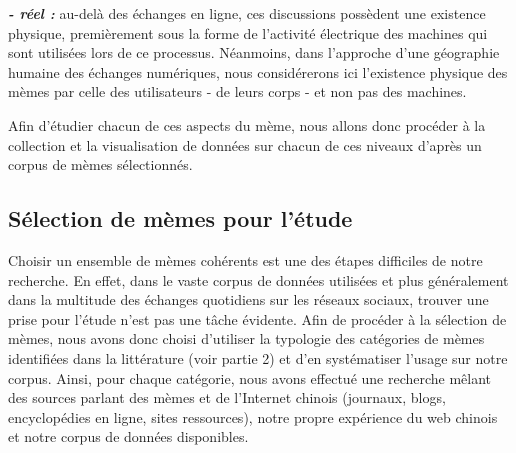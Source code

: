 \textbf{\textit{{}- réel : }}au-delà des échanges en ligne, ces
discussions possèdent une existence physique, premièrement sous la
forme de l{\textquoteright}activité électrique des machines qui
sont utilisées lors de ce processus. Néanmoins, dans
l{\textquoteright}approche d{\textquoteright}une géographie humaine
des échanges numériques, nous considérerons ici
l{\textquoteright}existence physique des mèmes par celle des
utilisateurs - de leurs corps - et non pas des machines.

Afin d{\textquoteright}étudier chacun de ces aspects du mème, nous
allons donc procéder à la collection et la visualisation de
données sur chacun de ces niveaux d{\textquoteright}après un corpus
de mèmes sélectionnés.

\subsection[Sélection de mèmes pour l{\textquoteright}étude]{\textmd{\textup{ Sélection de
mèmes pour l{\textquoteright}étude}}}
Choisir un ensemble de mèmes cohérents est une des étapes
difficiles de notre recherche. En effet, dans le vaste corpus de
données utilisées et plus généralement dans la multitude des
échanges quotidiens sur les réseaux sociaux, trouver une prise pour
l{\textquoteright}étude n{\textquoteright}est pas une t\^ache
évidente. Afin de procéder à la sélection de mèmes, nous
avons donc choisi d{\textquoteright}utiliser la typologie des
catégories de mèmes identifiées dans la littérature (voir
partie 2) et d{\textquoteright}en systématiser
l{\textquoteright}usage sur notre corpus. Ainsi, pour chaque
catégorie, nous avons effectué une recherche m\^elant des sources
parlant des mèmes et de l{\textquoteright}Internet chinois (journaux,
blogs, encyclopédies en ligne, sites ressources), notre propre
expérience du web chinois et notre corpus de données disponibles.

